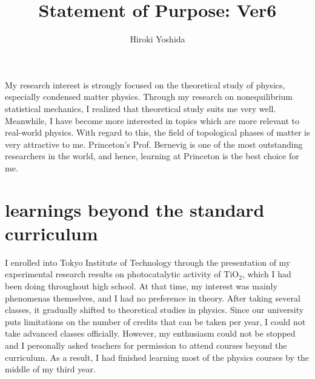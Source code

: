 \documentclass[a4]{article}
\title{Statement of Purpose: Ver6}
\author{Hiroki Yoshida}
\date{}
\begin{document}
\maketitle

My research interest is strongly focused on the theoretical study of physics, especially condensed matter physics. Through my research on nonequilibrium statistical mechanics, I realized that theoretical study suits me very well. Meanwhile, I have become more interested in topics which are more relevant to real-world physics. With regard to this, the field of topological phases of matter is very attractive to me. Princeton's Prof. Bernevig is one of the most outstanding researchers in the world, and hence, learning at Princeton is the best choice for me.\par

\section{learnings beyond the standard curriculum}
I enrolled into Tokyo Institute of Technology through the presentation of my experimental research results on photocatalytic activity of TiO$_2$, which I had been doing throughout high school. At that time, my interest was mainly phenomenas themselves, and I had no preference in theory. After taking several classes, it gradually shifted to theoretical studies in physics. Since our university puts limitations on the number of credits that can be taken per year, I could not take advanced classes officially. However, my enthusiasm could not be stopped and I personally asked teachers for permission to attend courses beyond the curriculum. As a result, I had finished learning most of the physics courses by the middle of my third year.\par
\end{document}
